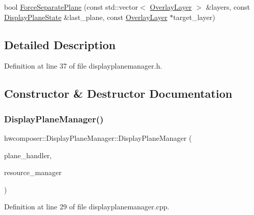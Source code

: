 \begin{DoxyCompactItemize}
\item 
bool \mbox{\hyperlink{classhwcomposer_1_1DisplayPlaneManager_afd4d9af275a937a7afa49a1d37ab0063}{Force\+Separate\+Plane}} (const std\+::vector$<$ \mbox{\hyperlink{structhwcomposer_1_1OverlayLayer}{Overlay\+Layer}} $>$ \&layers, const \mbox{\hyperlink{classhwcomposer_1_1DisplayPlaneState}{Display\+Plane\+State}} \&last\+\_\+plane, const \mbox{\hyperlink{structhwcomposer_1_1OverlayLayer}{Overlay\+Layer}} $\ast$target\+\_\+layer)
\end{DoxyCompactItemize}


\subsection{Detailed Description}


Definition at line 37 of file displayplanemanager.\+h.



\subsection{Constructor \& Destructor Documentation}
\mbox{\label{classhwcomposer_1_1DisplayPlaneManager_ad14eef5182a0ca73ed585de5db43b9f7}} 
\subsubsection{\texorpdfstring{Display\+Plane\+Manager()}{DisplayPlaneManager()}}
{\footnotesize\ttfamily hwcomposer\+::\+Display\+Plane\+Manager\+::\+Display\+Plane\+Manager (\begin{DoxyParamCaption}\item[{\mbox{\hyperlink{classhwcomposer_1_1DisplayPlaneHandler}{Display\+Plane\+Handler}} $\ast$}]{plane\+\_\+handler,  }\item[{\mbox{\hyperlink{classhwcomposer_1_1ResourceManager}{Resource\+Manager}} $\ast$}]{resource\+\_\+manager }\end{DoxyParamCaption})}



Definition at line 29 of file displayplanemanager.\+cpp.



